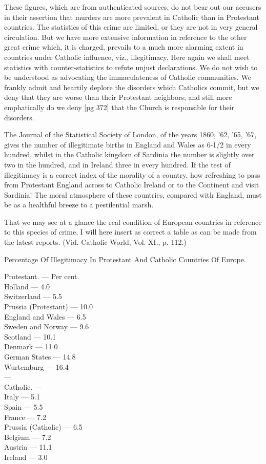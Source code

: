 These figures, which are from authenticated
sources, do not bear out our accusers in their assertion
that murders are more prevalent in Catholic
than in Protestant countries. The statistics of
this crime are limited, or they are not in very general
circulation. But we have more extensive information
in reference to the other great crime
which, it is charged, prevails to a much more
alarming extent in countries under Catholic influence,
viz., illegitimacy. Here again we shall
meet statistics with counter-statistics to refute unjust
declarations. We do not wish to be understood
as advocating the immaculateness of Catholic
communities. We frankly admit and heartily
deplore the disorders which Catholics commit, but
we deny that they are worse than their Protestant
neighbors; and still more emphatically do we deny
[pg 372]
that the Church is responsible for their disorders.

The Journal of the Statistical Society of London,
of the years 1860, '62, '65, '67, gives the number
of illegitimate births in England and Wales as
6-1/2 in every hundred, whilst in the Catholic kingdom
of Sardinia the number is slightly over two in
the hundred, and in Ireland three in every hundred.
If the test of illegitimacy is a correct index
of the morality of a country, how refreshing to
pass from Protestant England across to Catholic
Ireland or to the Continent and visit Sardinia!
The moral atmosphere of these countries, compared
with England, must be as a healthful breeze
to a pestilential marsh.

That we may see at a glance the real condition
of European countries in reference to this species
of crime, I will here insert as correct a table as can
be made from the latest reports. (Vid. Catholic
World, Vol. XI., p. 112.)

Percentage Of Illegitimacy In Protestant And
Catholic Countries Of Europe.

Protestant. — Per cent. \\
Holland — 4.0 \\
Switzerland — 5.5 \\
Prussia (Protestant) — 10.0 \\
England and Wales — 6.5 \\
Sweden and Norway — 9.6 \\
Scotland — 10.1 \\
Denmark — 11.0 \\
German States — 14.8 \\
Wurtemburg — 16.4 \\
— \\
Catholic. — \\
Italy — 5.1 \\
Spain — 5.5 \\
France — 7.2 \\
Prussia (Catholic) — 6.5 \\
Belgium — 7.2 \\
Austria — 11.1 \\
Ireland — 3.0

